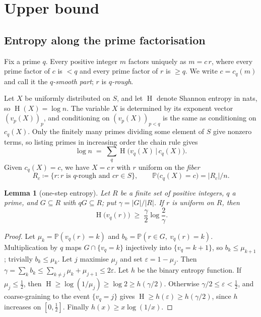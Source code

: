 \documentclass[11pt]{article}
\newtheorem{lemma}[theorem]{Lemma}
\theoremstyle{remark}
\newcommand{\Pp}{\mathbb{P}}
\DeclareMathOperator{\HH}{H}
\begin{document}
\section{Upper bound}

\subsection{Entropy along the prime factorisation}

Fix a prime $q$.
Every positive integer $m$ factors uniquely as $m=c\,r$, where every prime factor of $c$ is $<q$ and every prime factor of $r$ is $\ge q$.
We write $c=c_q(m)$ and call it the \emph{$q$-smooth part}; $r$ is \emph{$q$-rough}.

Let $X$ be uniformly distributed on $S$, and let $\HH$ denote Shannon entropy in nats, so $\HH(X)=\log n$.
The variable $X$ is determined by its exponent vector $(v_p(X))_p$, and conditioning on $(v_p(X))_{p<q}$ is the same as conditioning on $c_q(X)$.
Only the finitely many primes dividing some element of $S$ give nonzero terms, so listing primes in increasing order the chain rule gives
\begin{equation}\label{eq:chain}
  \log n \;=\; \sum_{q}\HH\bigl(v_q(X)\,\big|\,c_q(X)\bigr).
\end{equation}
Given $c_q(X)=c$, we have $X=c\,r$ with $r$ uniform on the \emph{fiber}
\[
  R_c\coloneqq\{r : r \text{ is $q$-rough and } cr\in S\},\qquad \Pp\bigl(c_q(X)=c\bigr)=|R_c|/n .
\]

\begin{lemma}[one-step entropy]\label{lem:step}
Let $R$ be a finite set of positive integers, $q$ a prime, and $G\subseteq R$ with $qG\subseteq R$; put $\gamma=|G|/|R|$.
If $r$ is uniform on $R$, then
\[
  \HH\bigl(v_q(r)\bigr)\;\ge\;\frac{\gamma}{2}\log\frac{2}{\gamma}.
\]
\end{lemma}

\begin{proof}
Let $\mu_k=\Pp(v_q(r)=k)$ and $b_k=\Pp(r\in G,\ v_q(r)=k)$.
Multiplication by $q$ maps $G\cap\{v_q=k\}$ injectively into $\{v_q=k+1\}$, so $b_k\le\mu_{k+1}$; trivially $b_k\le\mu_k$.
Let $j$ maximise $\mu_j$ and set $\varepsilon=1-\mu_j$.
Then $\gamma=\sum_k b_k\le\sum_{k\ne j}\mu_k+\mu_{j+1}\le 2\varepsilon$.
Let $h$ be the binary entropy function.
If $\mu_j\le\frac12$, then $\HH\ge\log(1/\mu_j)\ge\log 2\ge h(\gamma/2)$.
Otherwise $\gamma/2\le\varepsilon<\frac12$, and coarse-graining to the event $\{v_q=j\}$ gives $\HH\ge h(\varepsilon)\ge h(\gamma/2)$, since $h$ increases on $[0,\frac12]$.
Finally $h(x)\ge x\log(1/x)$.
\end{proof}
\end{document}

